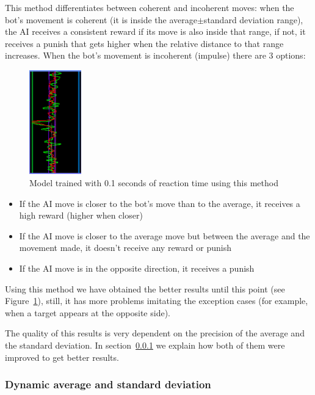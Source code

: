 This method differentiates between coherent and incoherent moves: when the bot's movement is coherent (it is inside the average$\pm$standard deviation range), the AI receives a consistent reward if its move is also inside that range, if not, it receives a punish that gets higher when the relative distance to that range increases. When the bot's movement is incoherent (impulse) there are 3 options:

\begin{figure}
    \centering
    \includegraphics[width=0.2\textwidth]{img/graphRTstd.png}
		\caption{Model trained with 0.1 seconds of reaction time using this method}
		\label{fig:graphRTstd}
\end{figure}

\begin{itemize}
 \item If the AI move is closer to the bot's move than to the average, it receives a high reward (higher when closer)
 \item If the AI move is closer to the average move but between the average and the movement made, it doesn't receive any reward or punish
 \item If the AI move is in the opposite direction, it receives a punish
\end{itemize}

Using this method we have obtained the better results until this point (see Figure~\ref{fig:graphRTstd}), still, it has more problems imitating the exception cases (for example, when a target appears at the opposite side). 

The quality of this results is very dependent on the precision of the average and the standard deviation. In section~\ref{sec:dynamicstd} we explain how both of them were improved to get better results.

\subsubsection{Dynamic average and standard deviation}
\label{sec:dynamicstd}

